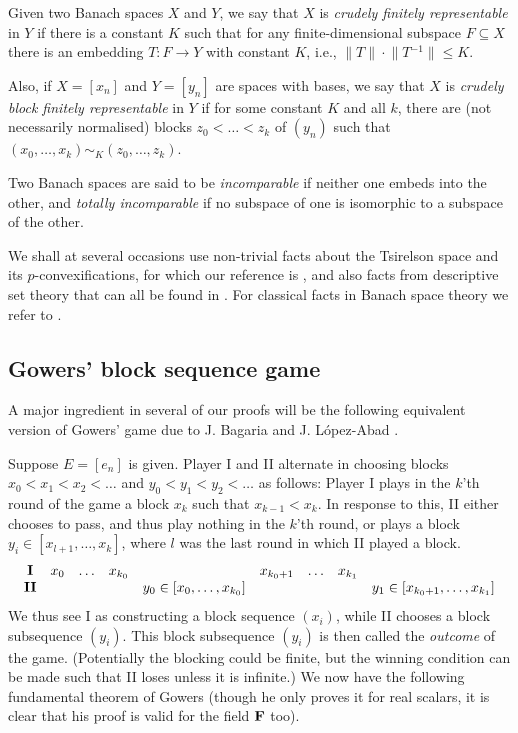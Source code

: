 \documentclass[10pt]{amsart}
\numberwithin{equation}{section}
\begin{document}
Given two Banach spaces $X$ and $Y$, we say that $X$ is {\em crudely finitely
representable} in $Y$ if there is a constant $K$ such that for any
finite-dimensional subspace $F\subseteq X$ there is an embedding $T\colon F{\rightarrow}
Y$ with constant $K$, i.e., ${\lVert{T}\rVert}\cdot{\lVert{T{^{-1}}}\rVert}{\ensuremath{\leqslant}} K$.

Also, if $X=[x_n]$ and $Y=[y_n]$ are spaces with bases, we say that $X$ is {\em
crudely block finitely representable} in $Y$ if for some constant $K$ and all
$k$, there are (not necessarily normalised) blocks $z_0<\ldots<z_k$ of $(y_n)$
such that $(x_0,\ldots,x_k)\sim_K(z_0,\ldots,z_k)$.

Two Banach spaces are said to be {\em incomparable} if neither one
embeds into the other, and {\em totally incomparable} if no subspace of one is
isomorphic to a subspace of the other.

We shall at several occasions use non-trivial facts about the Tsirelson space
and its $p$-convexifications,
for which our reference is \cite{CS}, and also facts from descriptive set
theory that can all be found in \cite{kechris}. For classical facts in Banach
space theory we refer to \cite{LT}.

\subsection{Gowers' block sequence game}
A major ingredient in several of our proofs will be the following equivalent version of
Gowers' game due to J. Bagaria and J. L\'opez-Abad \cite{BL}.

Suppose $E=[e_n]$ is given. Player I and II alternate in choosing blocks $x_0<x_1<x_2<\ldots$ and $y_0<y_1<y_2<\ldots$ as follows:
Player I plays in the $k$'th round of the game a block $x_k$
such that $x_{k-1}<x_k$. In response to this, II either chooses to
pass, and thus play nothing in the $k$'th round, or plays a block
$y_i\in [x_{l+1},\ldots,x_k]$, where $l$ was the last round
in which II played a block.
$$
\begin{array}{cccccccccccccc}
{\bf I} & x_0 &\ldots  & x_{k_0} &  & x_{k_0+1} & \ldots&
x_{k_1}&\\
{\bf II}  & &  & &y_0\in [x_0,\ldots,x_{k_0}] &  &  &  & y_1\in[x_{k_0+1},\ldots,x_{k_1}]
\end{array}
$$
We thus see I as constructing a block sequence $(x_i)$, while II chooses a
block subsequence $(y_i)$. This block subsequence $(y_i)$ is then called the
{\em outcome} of the game. (Potentially the blocking could be finite, but the
winning condition can be made such that II loses unless it is infinite.) We now
have the following fundamental theorem of Gowers (though he only proves it for
real scalars, it is clear that his proof is valid for the field ${\bf F}$ too).
\end{document}
